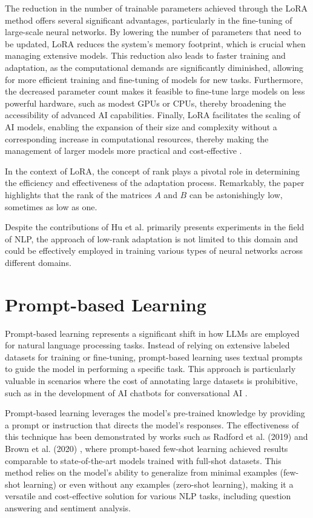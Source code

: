 The reduction in the number of trainable parameters achieved through the LoRA method offers several significant advantages, particularly in the fine-tuning of large-scale neural networks. By lowering the number of parameters that need to be updated, LoRA reduces the system's memory footprint, which is crucial when managing extensive models. This reduction also leads to faster training and adaptation, as the computational demands are significantly diminished, allowing for more efficient training and fine-tuning of models for new tasks. Furthermore, the decreased parameter count makes it feasible to fine-tune large models on less powerful hardware, such as modest GPUs or CPUs, thereby broadening the accessibility of advanced AI capabilities. Finally, LoRA facilitates the scaling of AI models, enabling the expansion of their size and complexity without a corresponding increase in computational resources, thereby making the management of larger models more practical and cost-effective \cite{towardsdatascience2024lora}.

In the context of LoRA, the concept of rank plays a pivotal role in determining the efficiency and effectiveness of the adaptation process. Remarkably, the paper highlights that the rank of the matrices \( A \) and \( B \) can be astonishingly low, sometimes as low as one.

Despite the contributions of Hu et al. \cite{hu2021lora} primarily presents experiments in the field of NLP, the approach of low-rank adaptation is not limited to this domain and could be effectively employed in training various types of neural networks across different domains.

\section{Prompt-based Learning}

Prompt-based learning represents a significant shift in how LLMs are employed for natural language processing tasks. Instead of relying on extensive labeled datasets for training or fine-tuning, prompt-based learning uses textual prompts to guide the model in performing a specific task. This approach is particularly valuable in scenarios where the cost of annotating large datasets is prohibitive, such as in the development of AI chatbots for conversational AI \cite{madotto2021few}.

Prompt-based learning leverages the model's pre-trained knowledge by providing a prompt or instruction that directs the model's responses. The effectiveness of this technique has been demonstrated by works such as Radford et al. (2019) \cite{radford2019language} and Brown et al. (2020) \cite{brown2020language}, where prompt-based few-shot learning achieved results comparable to state-of-the-art models trained with full-shot datasets. This method relies on the model's ability to generalize from minimal examples (few-shot learning) or even without any examples (zero-shot learning), making it a versatile and cost-effective solution for various NLP tasks, including question answering and sentiment analysis.

